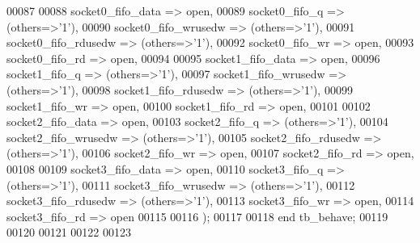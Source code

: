 \begin{DoxyCode}
00087 
00088         socket0_fifo_data       => \textcolor{keywordflow}{open},
00089         socket0_fifo_q          => \textcolor{vhdlchar}{(}\textcolor{keywordflow}{others}=>'1'\textcolor{vhdlchar}{)},
00090         socket0_fifo_wrusedw    => \textcolor{vhdlchar}{(}\textcolor{keywordflow}{others}=>'1'\textcolor{vhdlchar}{)},
00091         socket0_fifo_rdusedw    => \textcolor{vhdlchar}{(}\textcolor{keywordflow}{others}=>'1'\textcolor{vhdlchar}{)},
00092         socket0_fifo_wr     => \textcolor{keywordflow}{open},
00093         socket0_fifo_rd     => \textcolor{keywordflow}{open},
00094 
00095         socket1_fifo_data       => \textcolor{keywordflow}{open},
00096         socket1_fifo_q          => \textcolor{vhdlchar}{(}\textcolor{keywordflow}{others}=>'1'\textcolor{vhdlchar}{)},
00097         socket1_fifo_wrusedw    => \textcolor{vhdlchar}{(}\textcolor{keywordflow}{others}=>'1'\textcolor{vhdlchar}{)},
00098         socket1_fifo_rdusedw    => \textcolor{vhdlchar}{(}\textcolor{keywordflow}{others}=>'1'\textcolor{vhdlchar}{)},
00099         socket1_fifo_wr     => \textcolor{keywordflow}{open},
00100         socket1_fifo_rd     => \textcolor{keywordflow}{open},
00101 
00102         socket2_fifo_data       => \textcolor{keywordflow}{open},
00103         socket2_fifo_q          => \textcolor{vhdlchar}{(}\textcolor{keywordflow}{others}=>'1'\textcolor{vhdlchar}{)},
00104         socket2_fifo_wrusedw    => \textcolor{vhdlchar}{(}\textcolor{keywordflow}{others}=>'1'\textcolor{vhdlchar}{)},
00105         socket2_fifo_rdusedw    => \textcolor{vhdlchar}{(}\textcolor{keywordflow}{others}=>'1'\textcolor{vhdlchar}{)},
00106         socket2_fifo_wr     => \textcolor{keywordflow}{open},
00107         socket2_fifo_rd     => \textcolor{keywordflow}{open},
00108 
00109         socket3_fifo_data       => \textcolor{keywordflow}{open},
00110         socket3_fifo_q          => \textcolor{vhdlchar}{(}\textcolor{keywordflow}{others}=>'1'\textcolor{vhdlchar}{)},
00111         socket3_fifo_wrusedw    => \textcolor{vhdlchar}{(}\textcolor{keywordflow}{others}=>'1'\textcolor{vhdlchar}{)},
00112         socket3_fifo_rdusedw    => \textcolor{vhdlchar}{(}\textcolor{keywordflow}{others}=>'1'\textcolor{vhdlchar}{)},
00113         socket3_fifo_wr     => \textcolor{keywordflow}{open},
00114         socket3_fifo_rd     => \textcolor{keywordflow}{open}
00115     
00116     \textcolor{vhdlchar}{)};
00117     
00118     \textcolor{keywordflow}{end} \textcolor{vhdlchar}{tb\_behave};
00119   
00120   
00121 
00122 
00123   
\end{DoxyCode}

